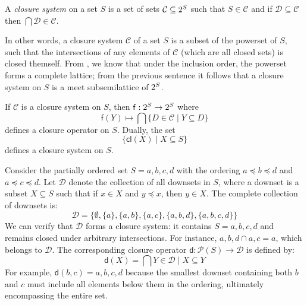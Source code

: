 \begin{definition}
\label{definition:closure-system}
A \emph{closure system} on a set $S$ is a set of sets $\mathcal{C} \subseteq 2^{S}$ such that $S \in \mathcal{C}$ and if $\mathcal{D} \subseteq \mathcal{C}$ then $\bigcap \mathcal{D} \in \mathcal{C}$.
\end{definition}

In other words, a closure system $\mathcal{C}$ of a set $S$ is a subset of the powerset of $S$, such that the intersections of any elements of $\mathcal{C}$ (which are all closed sets) is closed themself. From , we know that under the inclusion order, the powerset forms a complete lattice; from the previous sentence it follows that a closure system on $S$ is a meet subsemilattice of $2^{S}$.

\begin{theorem}
\label{theorem:relation-closure-operator-systems}
	If $\mathcal{C}$ is a closure system on $S$, then $\mathsf{f} : 2^{S} \to 2^{S}$
	where \[\mathsf{f}(Y) \mapsto \bigcap \{D \in \mathcal{C} \mid Y \subseteq D\}\] defines a closure operator on $S$. Dually, the set
	\[\{\mathsf{cl}(X) \mid X \subseteq S\}\]
	defines a closure system on $S$.
\end{theorem}

\begin{example}
Consider the partially ordered set $S = {a, b, c, d}$ with the ordering $a \preceq b \preceq d$ and $a \preceq c \preceq d$. Let $\mathcal{D}$ denote the collection of all downsets in $S$, where a downset is a subset $X \subseteq S$ such that if $x \in X$ and $y \preceq x$, then $y \in X$.
The complete collection of downsets is:
\[\mathcal{D} = \big\{\emptyset, \{a\}, \{a,b\}, \{a,c\}, \{a,b,d\}, \{a,b,c,d\}\big\}\]
We can verify that $\mathcal{D}$ forms a closure system: it contains $S = {a,b,c,d}$ and remains closed under arbitrary intersections. For instance, ${a,b,d} \cap {a,c} = {a}$, which belongs to $\mathcal{D}$.
The corresponding closure operator $\mathsf{d}: \mathcal{P}(S) \to \mathcal{D}$ is defined by:
\[\mathsf{d}(X) = \bigcap {Y \in \mathcal{D} \mid X \subseteq Y}\]
For example, $\mathsf{d}({b,c}) = {a,b,c,d}$ because the smallest downset containing both $b$ and $c$ must include all elements below them in the ordering, ultimately encompassing the entire set.
\end{example}

